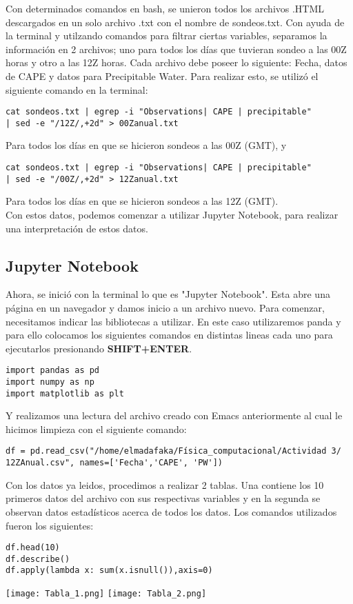 \documentclass{article}
\begin{document}
Con determinados comandos en bash, se unieron todos los archivos .HTML descargados en un solo archivo .txt con el nombre de sondeos.txt. Con ayuda de la terminal y utilzando comandos para filtrar ciertas variables, separamos la información en 2 archivos; uno para todos los días que tuvieran sondeo a las 00Z horas y otro a las 12Z horas. Cada archivo debe poseer lo siguiente: Fecha, datos de CAPE y datos para Precipitable Water. Para realizar esto, se utilizó el siguiente comando en la terminal:\\
\begin{verbatim}
cat sondeos.txt | egrep -i "Observations| CAPE | precipitable" 
| sed -e "/12Z/,+2d" > 00Zanual.txt
\end{verbatim}
\bigskip
Para todos los días en que se hicieron sondeos a las 00Z (GMT), y\\
\begin{verbatim}
cat sondeos.txt | egrep -i "Observations| CAPE | precipitable" 
| sed -e "/00Z/,+2d" > 12Zanual.txt
\end{verbatim}
\bigskip
Para todos los días en que se hicieron sondeos a las 12Z (GMT).\\ Con estos datos, podemos comenzar a utilizar Jupyter Notebook, para realizar una interpretación de estos datos.
\newpage


\subsection{\huge Jupyter Notebook}
\bigskip
Ahora, se inició con la terminal lo que es "Jupyter Notebook". Esta abre una página en un navegador y damos inicio a un archivo nuevo. Para comenzar, necesitamos indicar las bibliotecas a utilizar. En este caso utilizaremos panda y para ello colocamos los siguientes comandos en distintas lineas cada uno para ejecutarlos presionando \textbf{SHIFT+ENTER}.
\begin{verbatim}
import pandas as pd
import numpy as np
import matplotlib as plt
\end{verbatim}
\bigskip
Y realizamos una lectura del archivo creado con Emacs anteriormente al cual le hicimos limpieza con el siguiente comando:
\begin{verbatim}
df = pd.read_csv("/home/elmadafaka/Física_computacional/Actividad 3/
12ZAnual.csv", names=['Fecha','CAPE', 'PW'])
\end{verbatim}
\bigskip
Con los datos ya leidos, procedimos a realizar 2 tablas. Una contiene los 10 primeros datos del archivo con sus respectivas variables y en la segunda se observan datos estadísticos acerca de todos los datos. Los comandos utilizados fueron los siguientes:
\begin{verbatim}
df.head(10)
df.describe()
df.apply(lambda x: sum(x.isnull()),axis=0)
\end{verbatim}
\texttt{[image: Tabla\_1.png]}
\texttt{[image: Tabla\_2.png]}
\newpage
\end{document}
